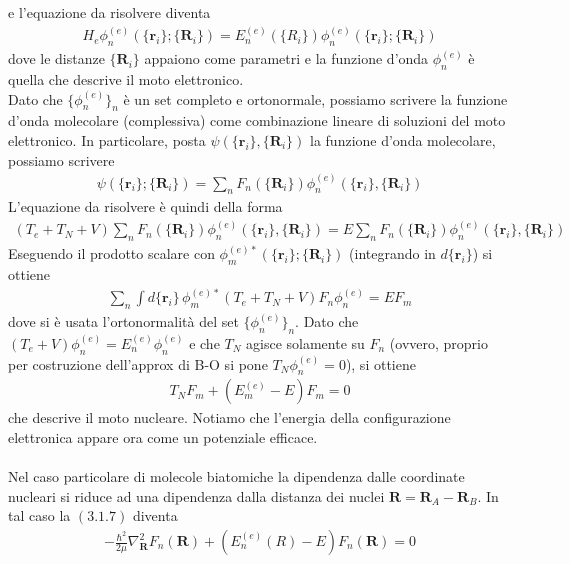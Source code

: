\documentclass{article}
\begin{document}
e l'equazione da risolvere diventa 
\begin{align}
    H_e\phi^{(e)}_n(\{\mathbf{r}_i\}; \{\mathbf{R}_i\}) = E^{(e)}_n(\{R_i\})\phi^{(e)}_n(\{\mathbf{r}_i\}; \{\mathbf{R}_i\}) \tag{3.1.3}
\end{align}
dove le distanze $\{\mathbf{R}_i\}$ appaiono come parametri e la funzione d'onda $\phi^{(e)}_n$ è quella che descrive il moto elettronico. \\
Dato che $\{\phi^{(e)}_n\}_n$ è un set completo e ortonormale, possiamo scrivere la funzione d'onda molecolare (complessiva) come combinazione lineare di soluzioni del moto elettronico. In particolare, posta $\psi(\{\mathbf{r}_i\}, \{\mathbf{R}_i\})$ la funzione d'onda molecolare, possiamo scrivere 
\begin{align}
    \psi(\{\mathbf{r}_i\}; \{\mathbf{R}_i\}) = \sum_n F_n(\{\mathbf{R}_i\})\phi^{(e)}_n(\{\mathbf{r}_i\}, \{\mathbf{R}_i\}) \tag{3.1.4}
\end{align}
L'equazione da risolvere è quindi della forma 
\begin{align}
    (T_e + T_N + V)\sum_n F_n(\{\mathbf{R}_i\})\phi^{(e)}_n(\{\mathbf{r}_i\}, \{\mathbf{R}_i\}) = E\sum_n F_n(\{\mathbf{R}_i\})\phi^{(e)}_n(\{\mathbf{r}_i\}, \{\mathbf{R}_i\}) \tag{3.1.5}
\end{align}
Eseguendo il prodotto scalare con $\phi^{(e)*}_m(\{\mathbf{r}_i\}; \{\mathbf{R}_i\})$ (integrando in $d\{\mathbf{r}_i\}$) si ottiene 
\begin{align}
    \sum_n \int d\{\mathbf{r}_i\} \, \phi^{(e)*}_m(T_e + T_N + V)F_n\phi^{(e)}_n = EF_{m} \tag{3.1.6}
\end{align}
dove si è usata l'ortonormalità del set $\{\phi^{(e)}_n\}_n$. Dato che $(T_e + V)\phi^{(e)}_n = E^{(e)}_n\phi^{(e)}_n$ e che $T_N$ agisce solamente su $F_n$ (ovvero, proprio per costruzione dell'approx di B-O si pone $T_N\phi^{(e)}_n = 0$), si ottiene 
\begin{align}
    T_NF_m + (E^{(e)}_m - E)F_m = 0 \tag{3.1.7}
\end{align}
che descrive il moto nucleare. Notiamo che l'energia della configurazione elettronica appare ora come un potenziale efficace. \\ \\
Nel caso particolare di molecole biatomiche la dipendenza dalle coordinate nucleari si riduce ad una dipendenza dalla distanza dei nuclei $\mathbf{R} = \mathbf{R}_A - \mathbf{R}_B$. In tal caso la $(3.1.7)$ diventa
\begin{align}
    -\frac{\hbar^2}{2\mu}\nabla^2_{\mathbf{R}}F_n(\mathbf{R}) + (E^{(e)}_n(R) - E)F_n(\mathbf{R}) = 0 \tag{3.1.8}
\end{align}
\end{document}
